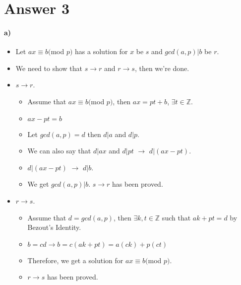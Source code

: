 \documentclass[12pt]{article}
\begin{document}
\section*{Answer 3}
\paragraph*{a)}
\begin{itemize}
            \item Let $ax \equiv b($mod $p)$ has a solution for $x$ be $s$ and $gcd(a, p)| b$ be $r$.
            \item We need to show that $s\rightarrow r$ and $r \rightarrow s$, then we're done.
            \item $s \rightarrow r$.
            \begin{itemize}
                \item Assume that $ax\equiv b($mod $ p)$, then $ax = pt + b$, $\exists t \in \mathbb{Z}$.
                \item $ax - pt = b$
                \item Let $gcd(a,p) = d$ then $d|a$ and $d|p$.
                \item We can also say that $d|ax$ and $d|pt$ $\rightarrow$ $d|(ax-pt)$.
                \item $d|(ax-pt)$ $\rightarrow$ $d|b$.
                \item We get $gcd(a,p)|b$. $s \rightarrow r$ has been proved.
            \end{itemize}{}
            \item $r \rightarrow s$.
            \begin{itemize}
                \item Assume that $d=gcd(a,p)$, then $\exists k,t \in \mathbb{Z}$  such that $ak+pt=d$ by Bezout's Identity.
                \item $b=cd \rightarrow b=c(ak+pt)=a(ck)+p(ct)$
                \item Therefore, we get a solution for $ax \equiv b($mod $p)$.
                \item $r\rightarrow s$ has been proved.
            \end{itemize}{}
\end{itemize}{}
\end{document}

